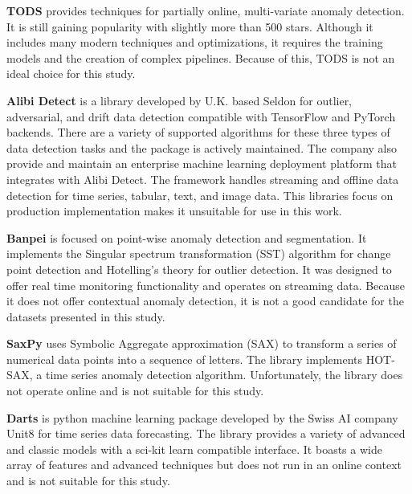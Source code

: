 \textbf{TODS} \parencite{Lai_2021_TODS} provides techniques for partially online, multi-variate anomaly detection. It is still gaining popularity with slightly more than 500 stars. Although it includes many modern techniques and optimizations, it requires the training models and the creation of complex pipelines. Because of this, TODS is not an ideal choice for this study.

\textbf{Alibi Detect} \parencite{alibi-detect} is a library developed by U.K. based Seldon for outlier, adversarial, and drift data detection compatible with TensorFlow and PyTorch backends. There are a variety of supported algorithms for these three types of data detection tasks and the package is actively maintained. The company also provide and maintain an enterprise machine learning deployment platform that integrates with Alibi Detect. The framework handles streaming and offline data detection for time series, tabular, text, and image data. This libraries focus on production implementation makes it unsuitable for use in this work.

\textbf{Banpei} \parencite{banpei} is focused on point-wise anomaly detection and segmentation.
It implements the Singular spectrum transformation (SST) algorithm for change point detection and Hotelling's theory for outlier detection. It was designed to offer real time monitoring functionality and operates on streaming data. Because it does not offer contextual anomaly detection, it is not a good candidate for the datasets presented in this study.

\textbf{SaxPy} \parencite{senin2018grammarviz-saxpy} uses Symbolic Aggregate approximation (SAX) to transform a series of numerical data points into a sequence of letters. The library implements HOT-SAX, a time series anomaly detection algorithm. Unfortunately, the library does not operate online and is not suitable for this study.


\textbf{Darts} \parencite{herzen2021darts} is python machine learning package developed by the Swiss AI company Unit8 for time series data forecasting. The library provides a variety of advanced and classic models with a sci-kit learn compatible interface. It boasts a wide array of features and advanced techniques but does not run in an online context and is not suitable for this study.

